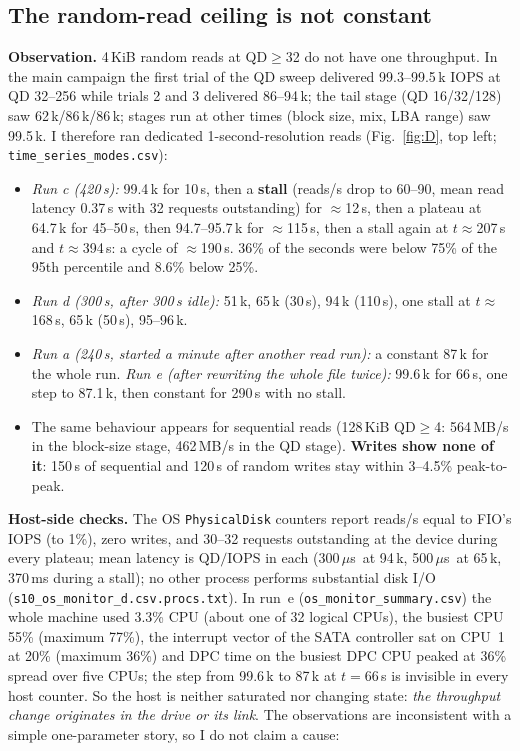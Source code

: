 ﻿\documentclass[10.5pt]{article}
\newcommand{\us}{\,$\mu$s}
\begin{document}
\subsection{The random-read ceiling is not constant}
\textbf{Observation.} 4\,KiB random reads at QD$\ge$32 do not have one throughput. In the main campaign the first trial of the QD sweep delivered 99.3--99.5\,k IOPS at QD 32--256 while trials 2 and 3 delivered 86--94\,k; the tail stage (QD 16/32/128) saw 62\,k/86\,k/86\,k; stages run at other times (block size, mix, LBA range) saw 99.5\,k. I therefore ran dedicated 1-second-resolution reads (Fig.~\ref{fig:D}, top left; \texttt{time\_series\_modes.csv}):
\begin{itemize}
  \item \emph{Run c (420\,s):} 99.4\,k for 10\,s, then a \textbf{stall} (reads/s drop to 60--90, mean read latency 0.37\,s with 32 requests outstanding) for $\approx$12\,s, then a plateau at 64.7\,k for 45--50\,s, then 94.7--95.7\,k for $\approx$115\,s, then a stall again at $t\approx$207\,s and $t\approx$394\,s: a cycle of $\approx$190\,s. 36\% of the seconds were below 75\% of the 95th percentile and 8.6\% below 25\%.
  \item \emph{Run d (300\,s, after 300\,s idle):} 51\,k, 65\,k (30\,s), 94\,k (110\,s), one stall at $t\approx$168\,s, 65\,k (50\,s), 95--96\,k.
  \item \emph{Run a (240\,s, started a minute after another read run):} a constant 87\,k for the whole run. \emph{Run e (after rewriting the whole file twice):} 99.6\,k for 66\,s, one step to 87.1\,k, then constant for 290\,s with no stall.
  \item The same behaviour appears for sequential reads (128\,KiB QD$\ge$4: 564\,MB/s in the block-size stage, 462\,MB/s in the QD stage). \textbf{Writes show none of it}: 150\,s of sequential and 120\,s of random writes stay within 3--4.5\% peak-to-peak.
\end{itemize}
\textbf{Host-side checks.} The OS \texttt{PhysicalDisk} counters report reads/s equal to FIO's IOPS (to 1\%), zero writes, and 30--32 requests outstanding at the device during every plateau; mean latency is $\text{QD}/\text{IOPS}$ in each (300\us\ at 94\,k, 500\us\ at 65\,k, 370\,ms during a stall); no other process performs substantial disk I/O (\texttt{s10\_os\_monitor\_d.csv.procs.txt}). In run~e (\texttt{os\_monitor\_summary.csv}) the whole machine used 3.3\% CPU (about one of 32 logical CPUs), the busiest CPU 55\% (maximum 77\%), the interrupt vector of the SATA controller sat on CPU~1 at 20\% (maximum 36\%) and DPC time on the busiest DPC CPU peaked at 36\% spread over five CPUs; the step from 99.6\,k to 87\,k at $t=66$\,s is invisible in every host counter. So the host is neither saturated nor changing state: \emph{the throughput change originates in the drive or its link}. The observations are inconsistent with a simple one-parameter story, so I do not claim a cause:
\end{document}
